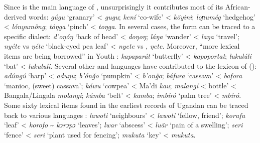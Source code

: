 \documentclass[output=paper]{langsci/langscibook}
\begin{document}
Since  is the main  language of  , unsurprisingly it contributes most of its African-derived words: \textit{gúgu} ‘granary’ <  \textit{gugu}; \textit{kení} ‘co-wife’ <  \textit{köyini}; \textit{loɲumég} `hedgehog' <  \textit{lónyumöng}; \textit{tóŋga} ‘pinch’ <  \textit{toŋga}. In several cases, the   form can be traced to a specific dialect: \textit{d'oŋóŋ} ‘back of head’ <  \textit{doŋoŋ}; \textit{láŋa} ‘wander’ <  \textit{laŋa} ‘travel’; \textit{nyéte} vs \textit{ŋéte} ‘black-eyed pea leaf’ <  \textit{nyete} vs ,  \textit{ŋete}. Moreover, “more  lexical items are being borrowed” in Youth   \citep[131]{Nakao2012}: \textit{kapaparát} ‘butterfly’ <  \textit{kapoportat}; \textit{lukulúli} ‘bat’ <  \textit{lukululi}. Several other  and  languages have contributed to the lexicon of   (\citealt{Nakao2012,Nakao2015}): \textit{adúngú} ‘harp’ <  \textit{aduŋu}; \textit{b'ónǧ}\textit{o} ‘pumpkin’ <  \textit{b'onǧo}; \textit{báfura} ‘cassava’ <  \textit{bafora} ‘manioc, (sweet) cassava’; \textit{káwu} ‘cowpea’ < Ma'di \textit{kau}; \textit{malangí} < bottle’ < Bangala/Lingala \textit{molangi}; \textit{kámba} ‘belt’ <  \textit{kamba}; \textit{imbíró} ‘palm tree’ <  \textit{mbíró}. Some sixty lexical items found in the earliest records of Ugandan  can be traced back to various  languages \citep{Avram2017talk}: \textit{lawoti} ‘neighbours’ <  \textit{lawoti} ‘fellow, friend’; \textit{korufu} ‘leaf’ <  \textit{korofo} {\textasciitilde} \textit{kɔrɔ}\textit{pɔ} ‘leaves’; \textit{lwar} ‘abscess’ <  \textit{luär} ‘pain of a swelling’; \textit{seri} ‘fence’ <  \textit{seri} ‘plant used for fencing’; \textit{mukuta} ‘key’ <  \textit{mukuta}.
\end{document}
